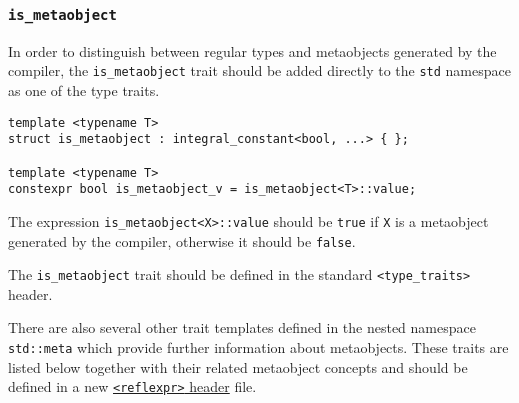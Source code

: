 \subsubsection{\texttt{is\_metaobject}}

In order to distinguish between regular types and metaobjects generated
by the compiler, the \texttt{is\_metaobject} trait should be added
directly to the \texttt{std} namespace as one of the type traits. 

\begin{verbatim}
template <typename T>
struct is_metaobject : integral_constant<bool, ...> { };

template <typename T>
constexpr bool is_metaobject_v = is_metaobject<T>::value;
\end{verbatim}

The expression \texttt{is\_metaobject<X>::value} should be \texttt{true}
if \texttt{X} is a metaobject generated by the compiler, otherwise it should
be \texttt{false}.

The \texttt{is\_metaobject} trait should be defined in the standard
\texttt{<type\_traits>} header.

There are also several other trait templates defined in the nested namespace
\texttt{std::meta} which provide further information about metaobjects.
These traits are listed below together with their related metaobject concepts
and should be defined in a new
\hyperref[section-reflexpr-header]{\texttt{<reflexpr>} header} file.
